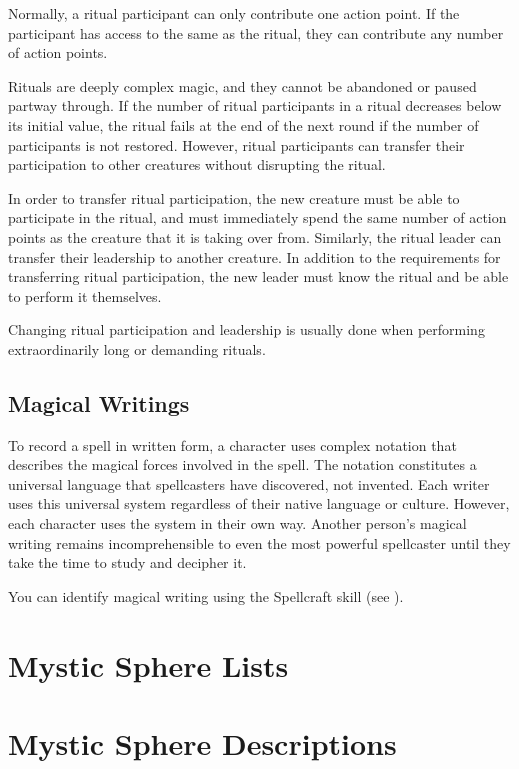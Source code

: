             Normally, a ritual participant can only contribute one action point.
            If the participant has access to the same  as the ritual, they can contribute any number of action points.

            Rituals are deeply complex magic, and they cannot be abandoned or paused partway through.
            If the number of ritual participants in a ritual decreases below its initial value, the ritual fails at the end of the next round if the number of participants is not restored.
            However, ritual participants can transfer their participation to other creatures without disrupting the ritual.

            In order to transfer ritual participation, the new creature must be able to participate in the ritual, and must immediately spend the same number of action points as the creature that it is taking over from.
            Similarly, the ritual leader can transfer their leadership to another creature.
            In addition to the requirements for transferring ritual participation, the new leader must know the ritual and be able to perform it themselves.

            Changing ritual participation and leadership is usually done when performing extraordinarily long or demanding rituals.

    \subsection{Magical Writings}
        To record a spell in written form, a character uses complex notation that describes the magical forces involved in the spell.
        The notation constitutes a universal language that spellcasters have discovered, not invented.
        Each writer uses this universal system regardless of their native language or culture.
        However, each character uses the system in their own way.
        Another person's magical writing remains incomprehensible to even the most powerful spellcaster until they take the time to study and decipher it.

        You can identify magical writing using the Spellcraft skill (see ).


\section{Mystic Sphere Lists}\label{Mystic Sphere Lists}

    

\section{Mystic Sphere Descriptions}\label{Mystic Sphere Descriptions}

    

